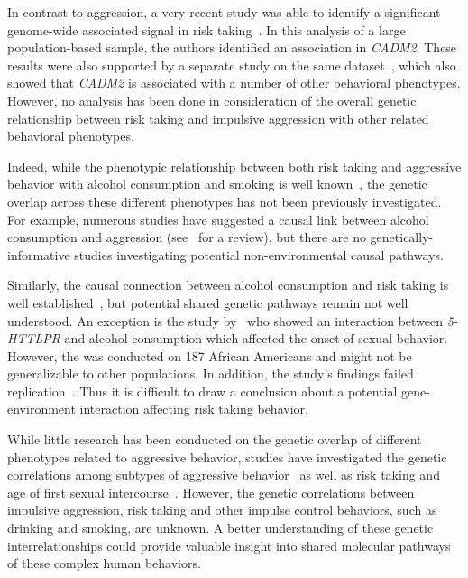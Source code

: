 In contrast to aggression, a very recent study was able to identify a significant genome-wide associated signal in risk taking~\cite{Day2016}. 
In this analysis of a large population-based sample, the authors identified an association in \textit{CADM2}.
These results were also supported by a separate study on the same dataset~\cite{Boutwell2017}, which also showed that \textit{CADM2} is associated with a number of other behavioral phenotypes.
However, no analysis has been done in consideration of the overall genetic relationship between risk taking and impulsive aggression with other related behavioral phenotypes.

Indeed, while the phenotypic relationship between both risk taking and aggressive behavior with alcohol consumption and smoking is well known~\cite{FRANZKOWIAX1987,Zuckerman2000,Dakwar2011},
the genetic overlap across these different phenotypes has not been previously investigated.
For example, numerous studies have suggested a causal link between alcohol consumption and aggression (see~\citet{Bushman1990} for a review), but there are no genetically-informative studies investigating potential non-environmental causal pathways.

Similarly, the causal connection between alcohol consumption and risk taking is well established~\cite{Lane2004}, but potential shared genetic pathways remain not well understood.
An exception is the study by~\cite{Kogan2010} who showed an interaction between \textit{5-HTTLPR} and alcohol consumption which affected the onset of sexual behavior. 
However, the was conducted on 187 African Americans and might not be generalizable to other populations. 
In addition, the study's findings failed replication~\cite{Rubens2016}.
Thus it is difficult to draw a conclusion about a potential gene-environment interaction affecting risk taking behavior.

While little research has been conducted on the genetic overlap of different phenotypes related to aggressive behavior, studies have investigated the genetic correlations among subtypes of aggressive behavior~\cite{Tuvblad2011a} as well as risk taking and age of first sexual intercourse~\cite{Day2016}.
However, the genetic correlations between impulsive aggression, risk taking and other impulse control behaviors, such as drinking and smoking, are unknown.
A better understanding of these genetic interrelationships could provide valuable insight into shared molecular pathways of these complex human behaviors.

